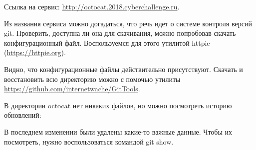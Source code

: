 
Ссылка на сервис: \url{http://octocat.2018.cyberchallenge.ru}.

\solutionSection

Из названия сервиса можно догадаться, что речь идет о системе контроля версий git. Проверить, доступна ли она для скачивания, можно попробовав скачать конфигурационный файл. Воспользуемся для этого утилитой httpie (\url{https://httpie.org}).


Видно, что конфигурационные файлы действительно присутствуют. Скачать и восстановить всю директорию можно с помочью утилиты \url{https://github.com/internetwache/GitTools}.


В директории octocat нет никаких файлов, но можно посмотреть историю обновлений:


В последнем изменении были удалены какие-то важные данные. Чтобы их посмотреть, нужно воспользоваться командой git show.


